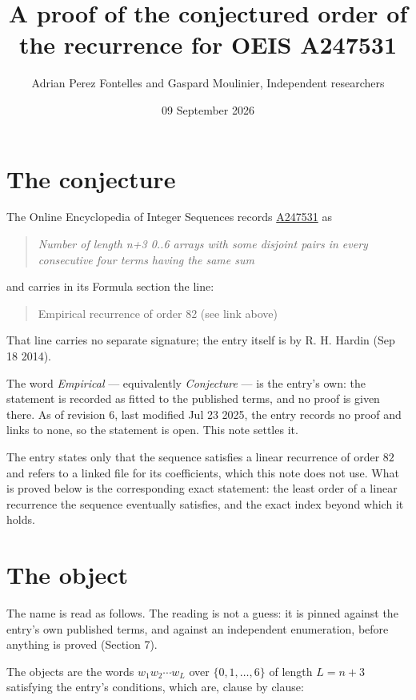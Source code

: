 \documentclass[11pt]{article}
\title{A proof of the conjectured order of the recurrence for OEIS A247531}
\author{Adrian Perez Fontelles and Gaspard Moulinier, Independent researchers}
\date{09 September 2026}
\theoremstyle{definition}
\begin{document}
\maketitle
\section{The conjecture}

The Online Encyclopedia of Integer Sequences records \href{https://oeis.org/A247531}{A247531} as

\begin{quote}\itshape Number of length n+3 0..6 arrays with some disjoint pairs in every consecutive four terms having the same sum\end{quote}

and carries in its Formula section the line:

\begin{quote}\ttfamily Empirical recurrence of order 82 (see link above)\end{quote}

That line carries no separate signature; the entry itself is by R. H. Hardin (Sep 18 2014).

The word {\itshape Empirical} --- equivalently {\itshape Conjecture} --- is the entry's own: the statement is recorded as fitted to the published terms, and no proof is given there. As of revision 6, last modified Jul 23 2025, the entry records no proof and links to none, so the statement is open. This note settles it.

The entry states only that the sequence satisfies a linear recurrence of order $82$ and refers to a linked file for its coefficients, which this note does not use. What is proved below is the corresponding exact statement: the least order of a linear recurrence the sequence eventually satisfies, and the exact index beyond which it holds.

\section{The object}

The name is read as follows. The reading is not a guess: it is pinned against the entry's own published terms, and against an independent enumeration, before anything is proved (Section 7).

The objects are the words $w_1 w_2 \cdots w_L$ over $\{0,1,\dots,6\}$ of length $L = n + 3$ satisfying the entry's conditions, which are, clause by clause:
\end{document}
